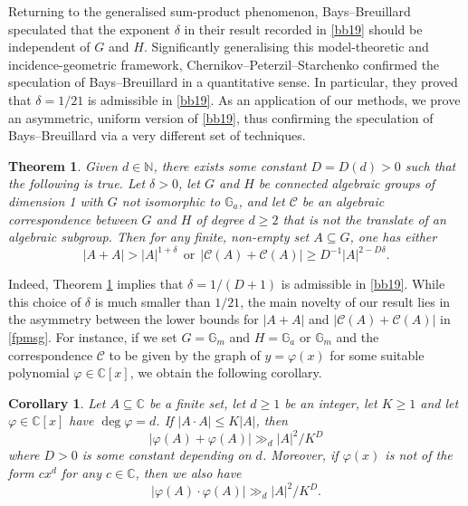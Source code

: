 \documentclass[12pt, reqno]{amsart}
\newtheorem{corollary}[theorem]{Corollary}
\newtheorem{thm}[theorem]{Theorem}
\theoremstyle{remark}
\theoremstyle{definition}
\numberwithin{equation}{section}
\begin{document}
Returning to the generalised sum-product phenomenon,  Bays--Breuillard \cite{BB2021} speculated that the exponent $\delta$ in their result recorded in \eqref{bb19} should be independent of $G$ and $H$. Significantly generalising this model-theoretic and incidence-geometric framework, Chernikov--Peterzil--Starchenko \cite{CPS2024} confirmed the speculation of Bays--Breuillard in a quantitative sense. In particular, they proved that $\delta = 1/21$ is admissible in  \eqref{bb19}. As an application of our methods, we prove an asymmetric, uniform version of \eqref{bb19}, thus confirming the speculation of Bays--Breuillard via a very different set of techniques.


\begin{thm} \label{sumprod1}
Given $d \in \mathbb{N}$, there exists some constant $D= D(d)>0$ such that the following is true.  Let $\delta >0$, let $G$ and $H$ be connected algebraic groups of dimension 1 with $G$ not isomorphic to $\mathbb{G}_a$, and let $\mathcal{C}$ be an algebraic correspondence between $G$ and $H$ of degree $d \geq 2$ that is not the translate of an algebraic subgroup.   Then for any finite, non-empty set $A \subseteq G$,  one has either
\begin{equation} \label{fpmsg}
|A+A| > |A|^{1 + \delta} \ \ \text{or} \ \ |\mathcal{C}(A) + \mathcal{C}(A)| \geq D^{-1} |A|^{2 - D\delta }.
\end{equation}
\end{thm}

Indeed, Theorem \ref{sumprod1} implies that $\delta = 1/(D+1)$ is admissible in \eqref{bb19}. While this choice of $\delta$ is much smaller than $1/21$, the main novelty of our result lies in the asymmetry between the lower bounds for $|A+A|$ and $|\mathcal{C}(A) + \mathcal{C}(A)|$ in \eqref{fpmsg}. For instance, if we set $G = \mathbb{G}_m$ and $H = \mathbb{G}_a$ or $\mathbb{G}_m$ and the correspondence $\mathcal{C}$ to be given by the graph of $y = \varphi(x)$ for some suitable polynomial $\varphi \in \mathbb{C}[x]$, we obtain the following corollary.

\begin{corollary} 
    Let $A \subseteq \mathbb{C}$ be a finite set, let $d \geq 1$ be an integer, let $K \geq 1$ and let $\varphi \in \mathbb{C}[x]$ have $\deg \varphi = d$. If $|A \cdot A| \leq K|A|$, then 
    \begin{equation} \label{wesz}
    |\varphi(A) + \varphi(A)| \gg_d |A|^{2}/K^{D}
    \end{equation}
    where $D>0$ is some constant depending on $d$. Moreover, if $\varphi(x)$ is not of the form $c x^d$ for any $c \in \mathbb{C}$, then we also have
    \[ |\varphi(A) \cdot \varphi(A)| \gg_d |A|^2/K^D.\]
\end{corollary}
\end{document}
